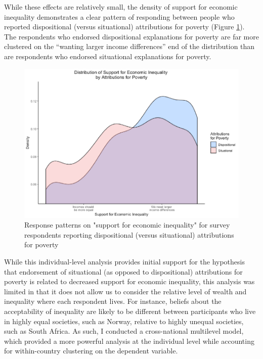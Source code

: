\documentclass{sfuthesis}
\begin{document}
While these effects are relatively small, the density of support for economic inequality demonstrates a clear pattern of responding between people who reported dispositional (versus situational) attributions for poverty (Figure \ref{fig:secondfig}). The respondents who endorsed dispositional explanations for poverty are far more clustered on the “wanting larger income differences” end of the distribution than are respondents who endorsed situational explanations for poverty.

\begin{figure}[h]
  \includegraphics[width=\linewidth]{Fig2-2.png}
  \caption{Response patterns on "support for economic inequality" for survey respondents reporting dispositional (versus situational) attributions for poverty}
  \label{fig:secondfig}
\end{figure}

While this individual-level analysis provides initial support for the hypothesis that endorsement of situational (as opposed to dispositional) attributions for poverty is related to decreased support for economic inequality, this analysis was limited in that it does not allow us to consider the relative level of wealth and inequality where each respondent lives. For instance, beliefs about the acceptability of inequality are likely to be different between participants who live in highly equal societies, such as Norway, relative to highly unequal societies, such as South Africa. As such, I conducted a cross-national multilevel model, which provided a more powerful analysis at the individual level while accounting for within-country clustering on the dependent variable. 
\end{document}
